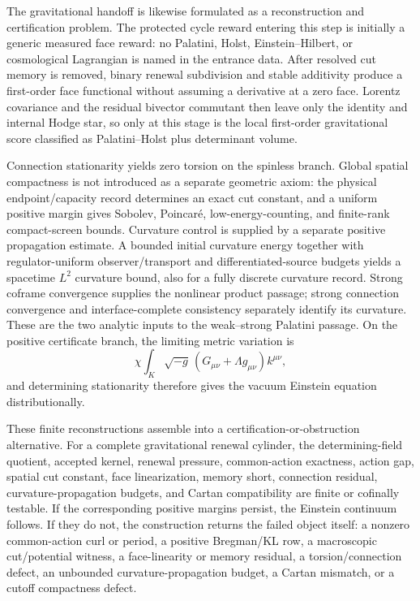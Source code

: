\documentclass[11pt]{article}
\numberwithin{equation}{section}
\theoremstyle{definition}
\theoremstyle{remark}
\begin{document}
The gravitational handoff is likewise formulated as a reconstruction and
certification problem.  The protected cycle reward entering this step is
initially a generic measured face reward: no Palatini, Holst,
Einstein--Hilbert, or cosmological Lagrangian is named in the entrance data.
After resolved cut memory is removed, binary renewal subdivision and stable
additivity produce a first-order face functional without assuming a derivative
at a zero face.  Lorentz covariance and the residual bivector commutant then
leave only the identity and internal Hodge star, so only at this stage is the
local first-order gravitational score classified as Palatini--Holst plus
determinant volume.

Connection stationarity yields zero torsion on the spinless branch.  Global
spatial compactness is not introduced as a separate geometric axiom: the
physical endpoint/capacity record determines an exact cut constant, and a
uniform positive margin gives Sobolev, Poincar\'e, low-energy-counting, and
finite-rank compact-screen bounds.  Curvature control is supplied by a separate
positive propagation estimate.  A bounded initial curvature energy together
with regulator-uniform observer/transport and differentiated-source budgets
yields a spacetime $L^2$ curvature bound, also for a fully discrete curvature
record.  Strong coframe convergence supplies the nonlinear product passage;
strong connection convergence and interface-complete consistency separately
identify its curvature.  These are the two analytic inputs to the
weak--strong Palatini passage.  On the positive certificate branch,
the limiting metric variation is
\begin{equation}
\chi\int_K\sqrt{-g}\,
(G_{\mu\nu}+\Lambda g_{\mu\nu})k^{\mu\nu},
\end{equation}
and determining stationarity therefore gives the vacuum Einstein equation
distributionally.

These finite reconstructions assemble into a certification-or-obstruction
alternative.  For a complete gravitational renewal cylinder, the
determining-field quotient, accepted kernel, renewal pressure, common-action
exactness, action gap, spatial cut constant, face linearization, memory short,
connection residual, curvature-propagation budgets, and Cartan compatibility
are finite or cofinally testable.  If the corresponding positive margins
persist, the Einstein continuum follows.  If they do not, the construction
returns the failed object itself: a nonzero common-action curl or period, a
positive Bregman/KL row, a macroscopic cut/potential witness, a
face-linearity or memory residual, a torsion/connection defect, an unbounded
curvature-propagation budget, a Cartan mismatch, or a cutoff compactness
defect.
\end{document}
